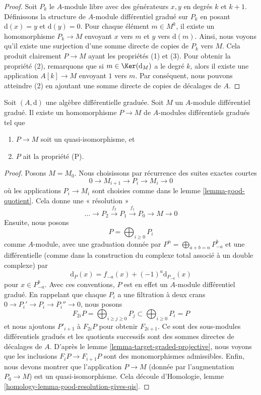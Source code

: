 \begin{proof}
Soit $P_k$ le $A$-module libre avec des générateurs $x, y$ en degrés $k$ et
$k + 1$. Définissons la structure de $A$-module différentiel gradué sur
$P_k$ en posant $\text{d}(x) = y$ et $\text{d}(y) = 0$. Pour chaque élément $m
\in M^k$, il existe un homomorphisme $P_k \to M$ envoyant $x$
vers $m$ et $y$ vers $\text{d}(m)$. Ainsi, nous voyons qu'il existe
une surjection d'une somme directe de copies de $P_k$ vers $M$.
Cela produit clairement $P \to M$ ayant les propriétés (1) et (3).
Pour obtenir la propriété (2), remarquons que si $m \in
\Ker(\text{d}_M)$ a le degré $k$, alors il existe une application $A[k] \to M$ envoyant
$1$ vers $m$. Par conséquent, nous pouvons atteindre (2) en ajoutant une somme
directe de copies de décalages de $A$.
\end{proof}

\begin{lemma}
\label{lemma-resolve}
Soit $(A, \text{d})$ une algèbre différentielle
graduée. Soit $M$ un $A$-module différentiel gradué. Il existe un homomorphisme
$P \to M$ de $A$-modules différentiels gradués tel que
\begin{enumerate}
\item $P \to M$ soit un quasi-isomorphisme, et
\item $P$ ait la propriété (P).
\end{enumerate}
\end{lemma}

\begin{proof}
Posons $M = M_0$. Nous choisissons par récurrence des suites exactes courtes
$$
0 \to M_{i + 1} \to P_i \to M_i \to 0
$$
où les applications $P_i \to M_i$ sont choisies comme dans le lemme
\ref{lemma-good-quotient}. Cela donne une « résolution »
$$
\ldots \to P_2 \xrightarrow{f_2} P_1 \xrightarrow{f_1} P_0 \to M \to 0
$$
Ensuite, nous posons
$$
P = \bigoplus\nolimits_{i \geq 0} P_i
$$
comme $A$-module, avec une graduation
donnée par $P^n = \bigoplus_{a + b = n} P_{-a}^b$
et une différentielle (comme dans la construction du complexe total associé à
un double complexe) par
$$
\text{d}_P(x) = f_{-a}(x) + (-1)^a \text{d}_{P_{-a}}(x)
$$
pour $x \in P_{-a}^b$. Avec ces conventions, $P$ est en effet un $A$-module
différentiel gradué. En rappelant que chaque $P_i$ a une filtration à deux crans $0
\to P_i' \to P_i \to P_i'' \to 0$, nous posons
$$
F_{2i}P = \bigoplus\nolimits_{i \geq j \geq 0} P_j
\subset
\bigoplus\nolimits_{i \geq 0} P_i = P
$$
et nous ajoutons $P'_{i + 1}$ à $F_{2i}P$ pour obtenir $F_{2i +
1}$. Ce sont des sous-modules différentiels gradués et les quotients successifs
sont des sommes directes de décalages de
$A$. D'après le lemme \ref{lemma-target-graded-projective},
nous voyons que les inclusions $F_iP \to F_{i + 1}P$ sont des monomorphismes
admissibles. Enfin, nous devons montrer que l'application $P \to M$
(donnée par l'augmentation $P_0 \to M$) est un quasi-isomorphisme. Cela découle
d'Homologie, lemme \ref{homology-lemma-good-resolution-gives-qis}.
\end{proof}






